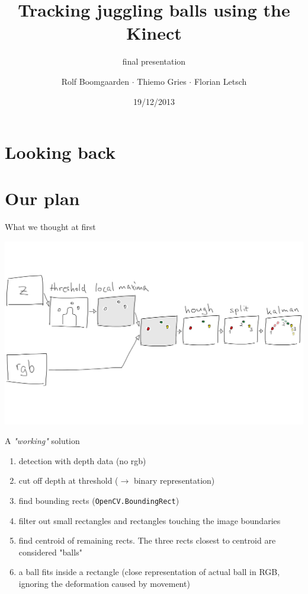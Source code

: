 \documentclass{beamer}
\title{Tracking juggling balls using the Kinect}
\subtitle{final presentation}
\author[Rolf $\cdot$ Thiemo $\cdot$ Flo]{Rolf Boomgaarden $\cdot$ Thiemo Gries $\cdot$ Florian Letsch}
\institute{Universität Hamburg}
\date{19/12/2013}
\begin{document}
\frame
{
\titlepage
}
\section{Looking back}

\section{Our plan}
\begin{frame}{What we thought at first}
\begin{center}\includegraphics[scale=0.1]{img/flowchart.png}\end{center}
\end{frame}

\begin{frame}{A \textit{"working"} solution}
\begin{enumerate}
	\item detection with depth data (no rgb)
	\item cut off depth at threshold ($\rightarrow$ binary representation)
	\item find bounding rects (\lstinline{OpenCV.BoundingRect})
	\item filter out small rectangles and rectangles touching the image boundaries
	\item find centroid of remaining rects. The three rects closest to centroid are considered "balls"
	\item a ball fits inside a rectangle (close representation of actual ball in RGB, ignoring the deformation caused by movement)
\end{enumerate}
\end{frame}
\end{document}
